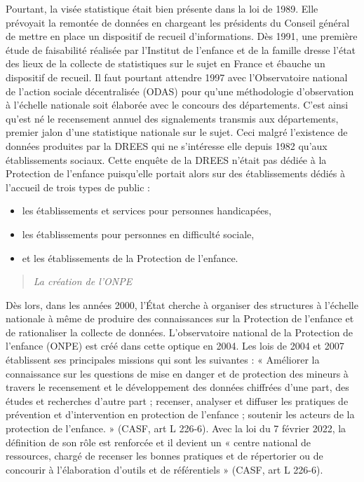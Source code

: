\documentclass[
  12,
  a4paper,
]{report}
\providecommand{\tightlist}{%
  \setlength{\itemsep}{0pt}\setlength{\parskip}{0pt}}
\begin{document}
Pourtant, la visée statistique était bien présente dans la loi de 1989.
Elle prévoyait la remontée de données en chargeant les présidents du
Conseil général de mettre en place un dispositif de recueil
d'informations. Dès 1991, une première étude de faisabilité réalisée par
l'Institut de l'enfance et de la famille dresse l'état des lieux de la
collecte de statistiques sur le sujet en France et ébauche un dispositif
de recueil. Il faut pourtant attendre 1997 avec l'Observatoire national
de l'action sociale décentralisée (ODAS) pour qu'une méthodologie
d'observation à l'échelle nationale soit élaborée avec le concours des
départements. C'est ainsi qu'est né le recensement annuel des
signalements transmis aux départements, premier jalon d'une statistique
nationale sur le sujet. Ceci malgré l'existence de données produites par
la DREES qui ne s'intéresse elle depuis 1982 qu'aux établissements
sociaux. Cette enquête de la DREES n'était pas dédiée à la Protection de
l'enfance puisqu'elle portait alors sur des établissements dédiés à
l'accueil de trois types de public :

\begin{itemize}
\tightlist
\item
  les établissements et services pour personnes handicapées,
\item
  les établissements pour personnes en difficulté sociale,
\item
  et les établissements de la Protection de l'enfance.
\end{itemize}

\begin{quote}
\emph{La création de l'ONPE}
\end{quote}

Dès lors, dans les années 2000, l'État cherche à organiser des
structures à l'échelle nationale à même de produire des connaissances
sur la Protection de l'enfance et de rationaliser la collecte de
données. L'observatoire national de la Protection de l'enfance (ONPE)
est créé dans cette optique en 2004. Les lois de 2004 et 2007
établissent ses principales missions qui sont les suivantes : «
Améliorer la connaissance sur les questions de mise en danger et de
protection des mineurs à travers le recensement et le développement des
données chiffrées d'une part, des études et recherches d'autre part ;
recenser, analyser et diffuser les pratiques de prévention et
d'intervention en protection de l'enfance ; soutenir les acteurs de la
protection de l'enfance. » (CASF, art L 226-6). Avec la loi du 7 février
2022, la définition de son rôle est renforcée et il devient un « centre
national de ressources, chargé de recenser les bonnes pratiques et de
répertorier ou de concourir à l'élaboration d'outils et de référentiels
» (CASF, art L 226-6).
\end{document}
